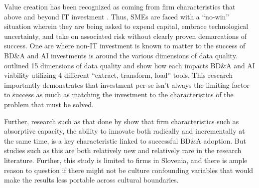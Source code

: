 Value creation has been recognized as coming from firm characteristics that above and beyond IT investment \parencite{bozicBusinessIntelligenceAnalytics2019}. Thus, SMEs are faced with a ``no-win'' situation wherein they are being asked to expend capital, embrace technological uncertainty, and take on associated risk without clearly proven demarcations of success. One are where non-IT investment is known to matter to the success of BD\&A and AI investments is around the various dimensions of data quality. \textcite{souibguiDataQualityETL2019} outlined 15 dimensions of data quality and show how each impacts BD\&A and AI viability utilizing 4 different ``extract, transform, load'' tools. This research importantly demonstrates that investment per-se isn't always the limiting factor to success as much as matching the investment to the characteristics of the problem that must be solved.

Further, research such as that done by \textcite{bozicBusinessIntelligenceAnalytics2019} show that firm characteristics such as absorptive capacity, the ability to innovate both radically and incrementally at the same time, is a key characteristic linked to successful BD\&A adoption. But studies such as this are both relatively new and relatively rare in the research literature. Further, this study is limited to firms in Slovenia, and there is ample reason to question if there might not be culture confounding variables that would make the results less portable across cultural boundaries.
